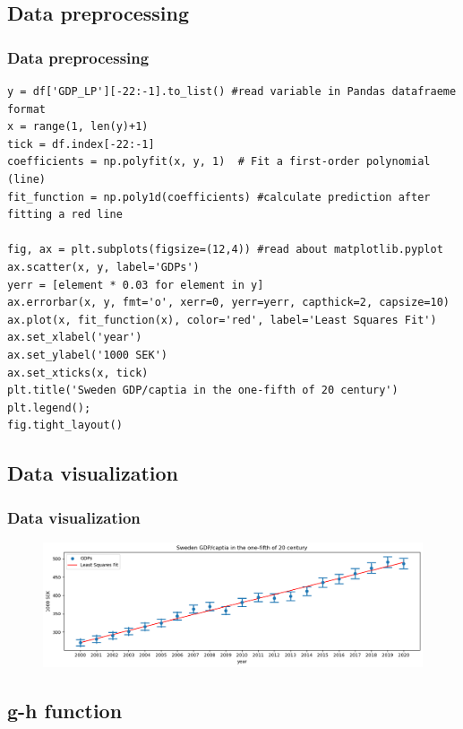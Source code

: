 \subsection{Data preprocessing}
\begin{frame}[fragile]
   \frametitle{Data preprocessing}
	
\begin{verbatim}
y = df['GDP_LP'][-22:-1].to_list() #read variable in Pandas datafraeme format
x = range(1, len(y)+1) 
tick = df.index[-22:-1]
coefficients = np.polyfit(x, y, 1)  # Fit a first-order polynomial (line)
fit_function = np.poly1d(coefficients) #calculate prediction after fitting a red line

fig, ax = plt.subplots(figsize=(12,4)) #read about matplotlib.pyplot
ax.scatter(x, y, label='GDPs')
yerr = [element * 0.03 for element in y]
ax.errorbar(x, y, fmt='o', xerr=0, yerr=yerr, capthick=2, capsize=10)
ax.plot(x, fit_function(x), color='red', label='Least Squares Fit')
ax.set_xlabel('year')
ax.set_ylabel('1000 SEK')
ax.set_xticks(x, tick)
plt.title('Sweden GDP/captia in the one-fifth of 20 century')
plt.legend();
fig.tight_layout()
\end{verbatim}

\end{frame}

\subsection{Data visualization}
\begin{frame}
   \frametitle{Data visualization}


   		\begin{figure}
		\centering
			\includegraphics[width=1\textwidth]{Figures/g-h_filter/data_vis.png}
		\label{data_vis}
	\end{figure}

 \end{frame}
 
\subsection{g-h function}

